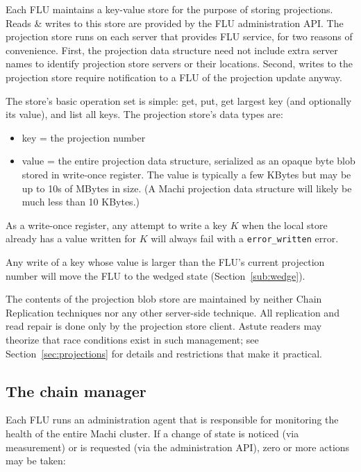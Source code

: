 \documentclass[preprint,10pt]{sigplanconf}
\begin{document}
Each FLU maintains a key-value store for the purpose of storing
projections.  Reads \& writes to this store are provided by the FLU
administration API.  The projection store runs on each server that
provides FLU service, for two reasons of convenience.  First, the
projection data structure
need not include extra server names to identify projection
store servers or their locations.
Second, writes to the projection store require
notification to a FLU of the projection update anyway.

The store's basic operation set is simple: get, put, get largest key
(and optionally its value), and list all keys.
The projection store's data types are:

\begin{itemize}
\item key = the projection number
\item value = the entire projection data structure, serialized as an
  opaque byte blob stored in write-once register. The value is 
  typically a few KBytes but may be up to 10s of MBytes in size.
  (A Machi projection data structure will likely be much less than 10
  KBytes.)
\end{itemize}

As a write-once register, any attempt to write a key $K$ when the
local store already has a value written for $K$ will always fail
with a {\tt error\_written} error.

Any write of a key whose value is larger than the FLU's current
projection number will move the FLU to the wedged state
(Section~\ref{sub:wedge}).

The contents of the projection blob store are maintained by neither
Chain Replication techniques nor any other server-side technique.  All
replication and read repair is done only by the projection store
client.  Astute readers may theorize that race conditions exist in
such management; see Section~\ref{sec:projections} for details and
restrictions that make it practical.

\subsection{The chain manager}
\label{sub:chain-manager}

Each FLU runs an administration agent that is responsible for
monitoring the health of the entire Machi cluster.  If a change of
state is noticed (via measurement) or is requested (via the
administration API), zero or more actions may be taken:
\end{document}
